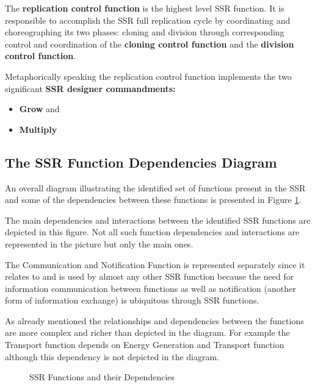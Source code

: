 \hypertarget{RefHeading3104306210128}{}The \textbf{replication control
function} is the highest level SSR function. It is responsible to
accomplish the SSR full replication cycle by coordinating and
choreographing its two phases: cloning and division through
corresponding control and coordination of the \textbf{cloning control
function} and the \textbf{division control function}.

Metaphorically speaking the replication control function implements the
two significant \textbf{SSR designer commandments:}

\begin{itemize}
\item \textbf{Grow} and
\item \textbf{Multiply}
\end{itemize}

\subsection[The SSR Function Dependencies Diagram]{The SSR Function
Dependencies Diagram}

\hypertarget{RefHeading3106306210128}{}An overall diagram illustrating
the identified set of functions present in the SSR and some of the
dependencies between these functions is presented in Figure \ref{fig:functions_and_dependencies}.

The main dependencies and interactions between the identified SSR
functions are depicted in this figure. Not all such function
dependencies and interactions are represented in the picture but only
the main ones. 

The Communication and Notification Function is represented separately
since it relates to and is used by almost any other SSR function
because the need for information communication between functions as
well as notification (another form of information exchange) is
ubiquitous through SSR functions.

As already mentioned the relationships and dependencies between the
functions are more complex and richer than depicted in the diagram. For
example the Transport function depends on Energy Generation and
Transport function although this dependency is not depicted in the
diagram.

\begin{figure}
	\label{fig:functions_and_dependencies}
	\caption{SSR Functions and their Dependencies}
\end{figure}

